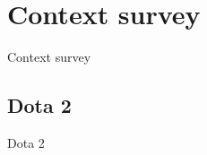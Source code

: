 \documentclass[Report.tex]{subfiles}
\begin{document}
\section{Context survey}

Context survey

\subsection{Dota 2}

Dota 2
\end{document}

